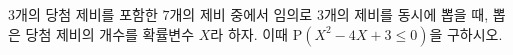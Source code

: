 $3$개의 당첨 제비를 포함한 $7$개의 제비 중에서 임의로 $3$개의 제비를 동시에 뽑을 때, 뽑은 당첨 제비의 개수를 확률변수 $X$라 하자. 이때 $\mathrm{P}(X^2-4X+3\le 0)$을 구하시오.
